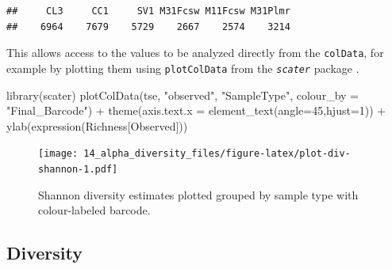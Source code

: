 \documentclass[
]{book}
\newenvironment{Shaded}{\begin{snugshade}}{\end{snugshade}}
\newcommand{\AttributeTok}[1]{\textcolor[rgb]{0.77,0.63,0.00}{#1}}
\newcommand{\DecValTok}[1]{\textcolor[rgb]{0.00,0.00,0.81}{#1}}
\newcommand{\FunctionTok}[1]{\textcolor[rgb]{0.00,0.00,0.00}{#1}}
\newcommand{\NormalTok}[1]{#1}
\newcommand{\OtherTok}[1]{\textcolor[rgb]{0.56,0.35,0.01}{#1}}
\newcommand{\SpecialCharTok}[1]{\textcolor[rgb]{0.00,0.00,0.00}{#1}}
\newcommand{\StringTok}[1]{\textcolor[rgb]{0.31,0.60,0.02}{#1}}
\begin{document}
\begin{Shaded}
\end{Shaded}

\begin{verbatim}
##     CL3     CC1     SV1 M31Fcsw M11Fcsw M31Plmr 
##    6964    7679    5729    2667    2574    3214
\end{verbatim}

This allows access to the values to be analyzed directly from the \texttt{colData}, for example
by plotting them using \texttt{plotColData} from the \emph{\texttt{scater}} package \citep{R_scater}.

\begin{Shaded}
\begin{Highlighting}[]
\FunctionTok{library}\NormalTok{(scater)}
\FunctionTok{plotColData}\NormalTok{(tse, }
            \StringTok{"observed"}\NormalTok{, }
            \StringTok{"SampleType"}\NormalTok{, }
            \AttributeTok{colour\_by =} \StringTok{"Final\_Barcode"}\NormalTok{) }\SpecialCharTok{+}
    \FunctionTok{theme}\NormalTok{(}\AttributeTok{axis.text.x =} \FunctionTok{element\_text}\NormalTok{(}\AttributeTok{angle=}\DecValTok{45}\NormalTok{,}\AttributeTok{hjust=}\DecValTok{1}\NormalTok{)) }\SpecialCharTok{+} 
  \FunctionTok{ylab}\NormalTok{(}\FunctionTok{expression}\NormalTok{(Richness[Observed]))}
\end{Highlighting}
\end{Shaded}

\begin{figure}
\centering
\texttt{[image: 14\_alpha\_diversity\_files/figure-latex/plot-div-shannon-1.pdf]}
\caption{\label{fig:plot-div-shannon}Shannon diversity estimates plotted grouped by sample type with colour-labeled barcode.}
\end{figure}

\hypertarget{estimate-diversity}{%
\subsection{Diversity}\label{estimate-diversity}}
\end{document}
